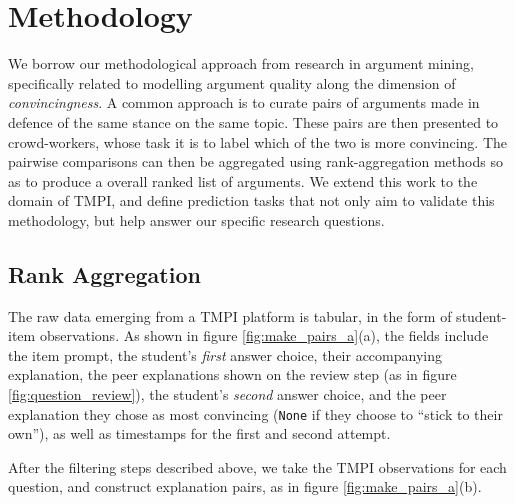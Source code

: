 \documentclass[notitlepage,12pt]{jedm}
\begin{document}
\section{Methodology}\label{sec:methodology}

We borrow our methodological approach from research in argument mining, 
specifically related to modelling argument quality along the dimension of 
\textit{convincingness}.
A common approach is to curate pairs of arguments made in defence of the same 
stance on the same topic.
These pairs are then presented to crowd-workers, whose task it is to label 
which of the two is more convincing. 
The pairwise comparisons can then be aggregated using rank-aggregation 
methods so as to produce a overall ranked list of arguments.
We extend this work to the domain of TMPI, and define prediction tasks that not 
only aim to validate this methodology, but help answer our specific research 
questions.

\subsection{Rank Aggregation}\label{sec:rank_agg}
The raw data emerging from a TMPI platform is tabular, in the form of 
student-item observations.
As shown in figure \ref{fig:make_pairs_a}(a), the fields include the item 
prompt, the student's \textit{first} answer choice, their accompanying 
explanation, the peer explanations shown on the review step (as in figure 
\ref{fig:question_review}), the student's 
\textit{second} answer choice, and the peer explanation they chose as most 
convincing (\verb|None| if they choose to ``stick to their own''), as well as 
timestamps for the first and second attempt.

After the filtering steps described above, we take the TMPI observations for 
each question, and construct explanation pairs, as in figure 
\ref{fig:make_pairs_a}(b).
\end{document}
